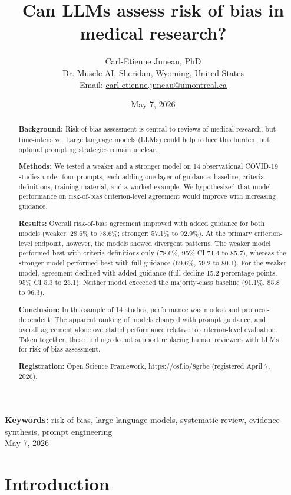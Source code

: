 \documentclass[11pt,a4paper]{article}
\title{Can LLMs assess risk of bias in medical research?}
\author{Carl-Etienne Juneau, PhD\\ \small Dr. Muscle AI, Sheridan, Wyoming, United States \\ \small Email: \href{mailto:carl-etienne.juneau@umontreal.ca}{carl-etienne.juneau@umontreal.ca}}
\date{May 7, 2026}
\begin{document}
\maketitle
\begin{abstract}
\textbf{Background:} Risk-of-bias assessment is central to reviews of medical research, but time-intensive. Large language models (LLMs) could help reduce this burden, but optimal prompting strategies remain unclear.

\textbf{Methods:} We tested a weaker and a stronger model on 14 observational COVID-19 studies under four prompts, each adding one layer of guidance: baseline, criteria definitions, training material, and a worked example. We hypothesized that model performance on risk-of-bias criterion-level agreement would improve with increasing guidance.

\textbf{Results:} Overall risk-of-bias agreement improved with added guidance for both models (weaker: 28.6\% to 78.6\%; stronger: 57.1\% to 92.9\%). At the primary criterion-level endpoint, however, the models showed divergent patterns. The weaker model performed best with criteria definitions only (78.6\%, 95\% CI 71.4 to 85.7), whereas the stronger model performed best with full guidance (69.6\%, 59.2 to 80.1). For the weaker model, agreement declined with added guidance (full decline 15.2 percentage points, 95\% CI 5.3 to 25.1). Neither model exceeded the majority-class baseline (91.1\%, 85.8 to 96.3).

\textbf{Conclusion:} In this sample of 14 studies, performance was modest and protocol-dependent. The apparent ranking of models changed with prompt guidance, and overall agreement alone overstated performance relative to criterion-level evaluation. Taken together, these findings do not support replacing human reviewers with LLMs for risk-of-bias assessment.

\textbf{Registration:} Open Science Framework, https://osf.io/8grbe (registered April 7, 2026).

\end{abstract}
\noindent\textbf{Keywords:} risk of bias, large language models, systematic review, evidence synthesis, prompt engineering\\
\vspace{0.5cm}
May 7, 2026

\section{Introduction}
\end{document}
